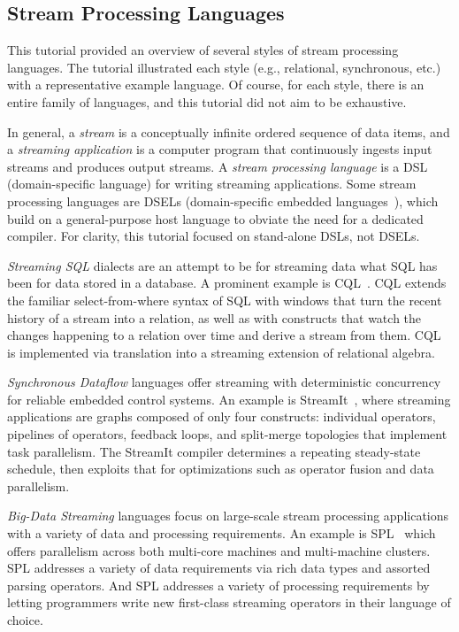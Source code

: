 \subsection{Stream Processing Languages}\label{sec:tut_lang}

This tutorial provided an overview of several styles of stream processing
languages. The tutorial illustrated each style (e.g., relational,
synchronous, etc.) with a representative example language. Of course,
for each style, there is an entire family of languages, and this
tutorial did not aim to be exhaustive.

In general, a \emph{stream} is a conceptually infinite ordered sequence of data
items, and a \emph{streaming application} is a computer program that
continuously ingests input streams and produces output streams.  A
\emph{stream processing language} is a DSL (domain-specific language)
for writing streaming applications. Some stream processing languages
are DSELs (do\-main-specific embedded languages~\cite{hudak_1998}),
which build on a general-purpose host language to obviate the need for
a dedicated compiler. For clarity, this tutorial focused on
stand-alone DSLs, not DSELs.

\emph{Streaming SQL} dialects are an attempt to be for streaming data
what SQL has been for data stored in a database. A prominent example
is \textsf{\small CQL}~\cite{arasu_babu_widom_2006}. \textsf{\small CQL} extends the familiar
select-from-where syntax of SQL with windows that turn the recent
history of a stream into a relation, as well as with constructs that
watch the changes happening to a relation over time and derive a
stream from them. \textsf{\small CQL} is implemented via translation into a streaming
extension of relational algebra.

\emph{Synchronous Dataflow} languages offer streaming with
deterministic concurrency for reliable embedded control systems. An
example is \textsf{\small StreamIt}~\cite{thies_et_al_2002}, where streaming
applications are graphs composed of only four constructs: individual
operators, pipe\-lines of operators, feedback loops, and split-merge
topologies that implement task parallelism. The StreamIt compiler
determines a repeating steady-state schedule, then exploits that for
optimizations such as operator fusion and data parallelism.

\emph{Big-Data Streaming} languages focus on large-scale stream
processing applications with a variety of data and processing
requirements. An example is \textsf{\small SPL}~\cite{hirzel_schneider_gedik_2017} which offers parallelism across both multi-core machines and
multi-machine clusters. SPL addresses a variety of data requirements
via rich data types and assorted parsing operators. And SPL addresses
a variety of processing requirements by letting programmers write new
first-class streaming operators in their language of choice.


